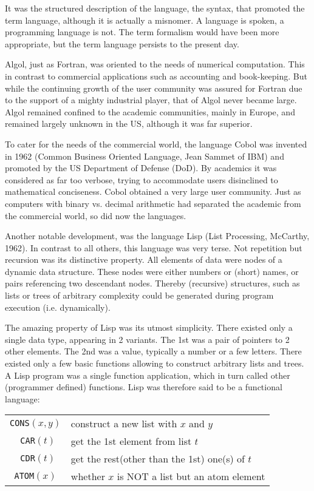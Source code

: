 It was the structured description of the language, the syntax, that promoted the
term language, although it is actually a misnomer. A language is spoken, a
programming language is not. The term formalism would have been more appropriate,
but the term language persists to the present day.

Algol, just as Fortran, was oriented to the needs of numerical computation. This in
contrast to commercial applications such as accounting and book-keeping. But
while the continuing growth of the user community was assured for Fortran due to
the support of a mighty industrial player, that of Algol never became large. Algol
remained confined to the academic communities, mainly in Europe, and remained
largely unknown in the US, although it was far superior.

To cater for the needs of the commercial world, the language Cobol was invented
in 1962 (Common Business Oriented Language, Jean Sammet of IBM) and
promoted by the US Department of Defense (DoD). By academics it was
considered as far too verbose, trying to accommodate users disinclined to
mathematical conciseness. Cobol obtained a very large user community. Just as
computers with binary vs. decimal arithmetic had separated the academic from the
commercial world, so did now the languages.

Another notable development, was the language Lisp (List Processing, McCarthy,
1962). In contrast to all others, this language was very terse. Not repetition but
recursion was its distinctive property. All elements of data were nodes of a
dynamic data structure. These nodes were either numbers or (short) names, or
pairs referencing two descendant nodes. Thereby (recursive) structures, such as
lists or trees of arbitrary complexity could be generated during program execution
(i.e. dynamically).

The amazing property of Lisp was its utmost simplicity. There existed only a single
data type, appearing in 2 variants. The 1st was a pair of pointers to 2 other
elements. The 2nd was a value, typically a number or a few letters. There existed
only a few basic functions allowing to construct arbitrary lists and trees. A Lisp
program was a single function application, which in turn called other (programmer
defined) functions. Lisp was therefore said to be a functional language:
\begin{table}[h!]
  \begin{tabular}{c l}\\
    \texttt{CONS}$(x, y)$ & construct a new list with $x$ and $y$ \\
    \texttt{ CAR}$(t)$    & get the 1st element from list $t$ \\
    \texttt{ CDR}$(t)$    & get the rest(other than the 1st) one(s) of $t$ \\
    \texttt{ATOM}$(x)$    & whether $x$ is NOT a list but an atom element
  \end{tabular}
\end{table}

